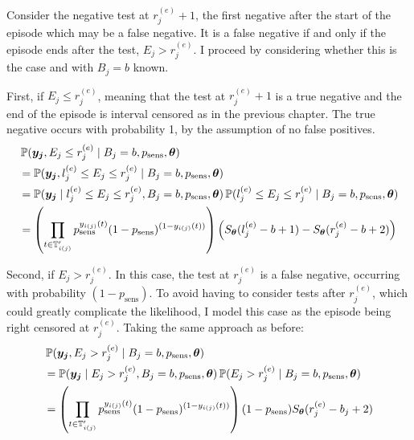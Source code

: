 \documentclass[thesis.tex]{subfiles}
\begin{document}
Consider the negative test at $r_j^{(e)}+1$, the first negative after the start of the episode which may be a false negative.
It is a false negative if and only if the episode ends after the test, \ie $E_j > r_j^{(e)}$.
I proceed by considering whether this is the case and with $B_j = b$ known.

First, if $E_j \leq r_j^{(e)}$, meaning that the test at $r_j^{(e)}+1$ is a true negative and the end of the episode is interval censored as in the previous chapter.
The true negative occurs with probability 1, by the assumption of no false positives.
\begin{align}
&\prob(\vec{y_j}, E_j \leq r_j^{(e)} \mid B_j = b, p_\text{sens}, \vec{\theta}) \\
&= \prob(\vec{y_j}, l_j^{(e)} \leq E_j \leq r_j^{(e)} \mid B_j = b, p_\text{sens}, \vec{\theta}) \\ %
&= \prob(\vec{y_j} \mid l_j^{(e)} \leq E_j \leq r_j^{(e)}, B_j = b, p_\text{sens}, \vec{\theta}) \prob(l_j^{(e)} \leq E_j \leq r_j^{(e)} \mid B_j = b, p_\text{sens}, \vec{\theta}) \\
&= \left( \prod_{t \in \sched'_{i(j)}} p_\text{sens}^{y_{i(j)}(t)} (1 - p_\text{sens})^{(1 - y_{i(j)}(t))} \right) \left( S_{\vec{\theta}}(l_j^{(e)} - b + 1) - S_{\vec{\theta}}(r_j^{(e)} - b + 2) \right)
\label{imperf-test:eq:ll-ei-lt-ri}
\end{align}

Second, if $E_j > r_j^{(e)}$.
In this case, the test at $r_j^{(e)}$ is a false negative, occurring with probability $(1 - p_\text{sens})$.
To avoid having to consider tests after $r_j^{(e)}$, which could greatly complicate the likelihood, I model this case as the episode being right censored at $r_j^{(e)}$.
Taking the same approach as before:
\begin{align}
&\operatorname{\mathbb{P}}(\bm{y_j}, E_j > r_j^{(e)} \mid B_j = b, p_\text{sens}, \bm{\theta}) \\
&= \operatorname{\mathbb{P}}(\bm{y_j} \mid E_j > r_j^{(e)}, B_j = b, p_\text{sens}, \bm{\theta}) \operatorname{\mathbb{P}}(E_j > r_j^{(e)} \mid B_j = b, p_\text{sens}, \bm{\theta}) \\
&= \left( \prod_{t \in \mathbb{T}'_{i(j)}} p_\text{sens}^{y_{i(j)}(t)} (1 - p_\text{sens})^{(1 - y_{i(j)}(t))} \right) (1 - p_\text{sens}) S_{\bm{\theta}}(r_j^{(e)} - b_j + 2)
\label{imperf-test:eq:ll-ei-gt-ri}
\end{align}
\end{document}
